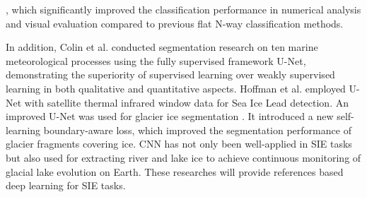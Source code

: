 \cite{142chen2023sea}, which significantly improved the classification performance in numerical analysis and visual evaluation compared to previous flat N-way classification methods.

In addition, Colin et al. \cite{118colin2022semantic} conducted segmentation research on ten marine meteorological processes using the fully supervised framework U-Net, demonstrating the superiority of supervised learning over weakly supervised learning in both qualitative and quantitative aspects. Hoffman et al. \cite{105hoffman2021application} employed U-Net with satellite thermal infrared window data for Sea Ice Lead detection. An improved U-Net was used for glacier ice segmentation \cite{129aryal2023boundary}. It introduced a new self-learning boundary-aware loss, which improved the segmentation performance of glacier fragments covering ice. CNN has not only been well-applied in SIE tasks but also used for extracting river and lake ice to achieve continuous monitoring of glacial lake evolution on Earth\cite{107saberi2022incorporating,108ma2021deep,106wang2022second}. These researches will provide references based deep learning for SIE tasks.


